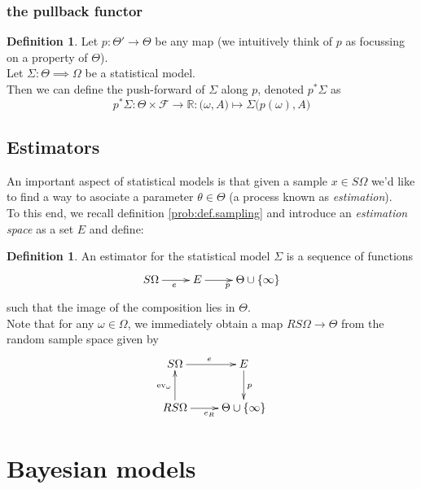 \documentclass{book}
\theoremstyle{plain}
\theoremstyle{definition}
\newtheorem{definition}[corollary]{Definition}
\renewcommand{\d}[1]{\mathbb{#1}}
\newcommand{\fun}{\mapsto}
\DeclareMathOperator{\ev}{ev}
\newcommand{\mor}{\longrightarrow}
\renewcommand{\r}[1]{\mathcal{#1}}
\begin{document}
\subsubsection{the pullback functor}

\begin{definition}
Let $p:\Theta'\mor \Theta$ be any map (we intuitively think of $p$ as focussing on a  property of $\Theta$).\\
Let $\Sigma: \Theta\implies \Omega$ be a statistical model.\\
Then we can define the push-forward of $\Sigma$ along $p$, denoted $p^*\Sigma$ as 
\[
p^*\Sigma: \Theta\times \r{F}\mor \d{R}: \big(\omega,A)\fun \Sigma\big(p(\omega), A\big)
\]
\end{definition}



\subsection{Estimators}

\noindent An important aspect of statistical models is that given a sample $x \in S\Omega$ we'd like to find a way to asociate a parameter $\theta \in \Theta$ (a process known as \emph{estimation}).\\
To this end, we  recall definition \ref{prob:def.sampling} and introduce an \emph{estimation space} as a set $E$ and define:

\begin{definition}\label{stats:def.estimators}
An estimator for the statistical model $\Sigma$ is a sequence of functions
\begin{displaymath}
\xymatrix{
S\Omega\ar[r]_{e} & E\ar[r]_p  & \Theta \cup \{\infty\}
}
\end{displaymath}
such that the image of the composition lies in $\Theta$.\\
Note that for any $\omega \in \Omega$, we immediately obtain a map $RS\Omega\mor \Theta$ from the random sample space given by
\begin{displaymath}
\xymatrix{
S\ar[r]^e\Omega & E\ar[d]^p\\
RS\ar[u]^{\ev_{\omega}}\ar[r]_{e_R}\Omega & \Theta\cup\{ \infty \}
}
\end{displaymath}
\end{definition}

\section{Bayesian models}
\end{document}
